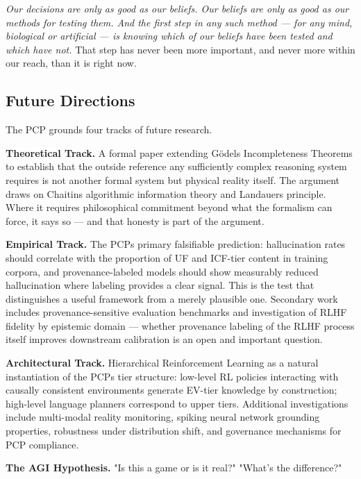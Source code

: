 \documentclass[12pt]{article}
\begin{document}
\emph{Our decisions are only as good as our beliefs. Our beliefs are
only as good as our methods for testing them. And the first step in any
such method --- for any mind, biological or artificial --- is knowing
which of our beliefs have been tested and which have not.} That step has
never been more important, and never more within our reach, than it is
right now.

\subsection{Future Directions}\label{future-directions}

The PCP grounds four tracks of future research.

\textbf{Theoretical Track.} A formal paper extending
Gödel\textquotesingle s Incompleteness Theorems to establish that the
outside reference any sufficiently complex reasoning system requires is
not another formal system but physical reality itself. The argument
draws on Chaitin\textquotesingle s algorithmic information theory and
Landauer\textquotesingle s principle. Where it requires philosophical
commitment beyond what the formalism can force, it says so --- and that
honesty is part of the argument.

\textbf{Empirical Track.} The PCP\textquotesingle s primary falsifiable
prediction: hallucination rates should correlate with the proportion of
UF and ICF-tier content in training corpora, and provenance-labeled
models should show measurably reduced hallucination where labeling
provides a clear signal. This is the test that distinguishes a useful
framework from a merely plausible one. Secondary work includes
provenance-sensitive evaluation benchmarks and investigation of RLHF
fidelity by epistemic domain --- whether provenance labeling of the RLHF
process itself improves downstream calibration is an open and important
question.

\textbf{Architectural Track.} Hierarchical Reinforcement Learning as a
natural instantiation of the PCP\textquotesingle s tier structure:
low-level RL policies interacting with causally consistent environments
generate EV-tier knowledge by construction; high-level language planners
correspond to upper tiers. Additional investigations include multi-modal
reality monitoring, spiking neural network grounding properties,
robustness under distribution shift, and governance mechanisms for PCP
compliance.

\textbf{The AGI Hypothesis.} "Is this a game or is it real?" "What's the
difference?"
\end{document}
